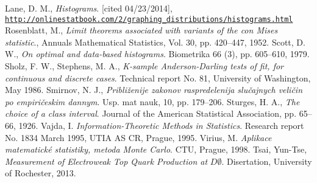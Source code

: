 \begin{thebibliography}{10}
 Lane, D. M., {\em Histograms}. [cited 04/23/2014], \\
\href{http://onlinestatbook.com/2/graphing_distributions/histograms.html}{\texttt{http://onlinestatbook.com/2/graphing\_distributions/histograms.html}}
 Rosenblatt, M., {\em Limit theorems associated with variants of the con Mises statistic}., Annuals Mathematical Statistics, Vol. 30, pp. 420--447, 1952.
 Scott, D. W., {\em On optimal and data-based histograms}. Biometrika 66 (3), pp. 605–610, 1979.
 Sholz, F. W., Stephens, M. A., {\em K-sample Anderson-Darling tests of fit, for continuous and discrete cases}. Technical report No. 81, University of Washington, May 1986.
Smirnov, N. J., {\em Pribli\v{z}enije zakonov raspredelenija slu\v{c}ajnych veli\v{c}in po empiri\v{c}eskim dannym}. Usp. mat nauk, 10, pp. 179--206.
 Sturges, H. A., {\em The choice of a class interval}. Journal of the American Statistical Association, pp. 65--66, 1926.
Vajda, I. {\em Information-Theoretic Methods in Statistics}. Research report No. 1834 March 1995, UTIA AS CR, Prague, 1995.
Virius, M. {\em Aplikace matematick\'e statistiky, metoda Monte Carlo}. CTU, Prague, 1998.
Tsai, Yun-Tse, {\em Measurement of Electroweak Top Quark Production at} $D\mathit{\emptyset}$. Disertation, University of Rochester, 2013.
\end{thebibliography}